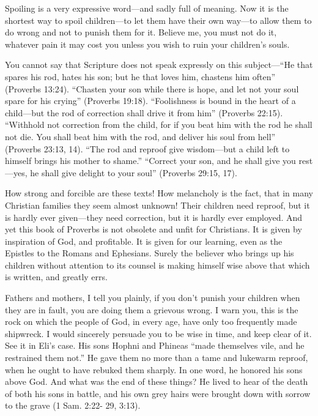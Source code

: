 \documentclass[
]{book}
\begin{document}
Spoiling is a very expressive word---and sadly full of meaning. Now it is the shortest way to spoil children---to let them have their own way---to allow them to do wrong and not to punish them for it. Believe me, you must not do it, whatever pain it may cost you unless you wish to ruin your children's souls.

You cannot say that Scripture does not speak expressly on this subject---``He that spares his rod, hates his son; but he that loves him, chastens him often'' (Proverbs 13:24). ``Chasten your son while there is hope, and let not your soul spare for his crying'' (Proverbs 19:18). ``Foolishness is bound in the heart of a child---but the rod of correction shall drive it from him'' (Proverbs 22:15). ``Withhold not correction from the child, for if you beat him with the rod he shall not die. You shall beat him with the rod, and deliver his soul from hell'' (Proverbs 23:13, 14). ``The rod and reproof give wisdom---but a child left to himself brings his mother to shame.'' ``Correct your son, and he shall give you rest---yes, he shall give delight to your soul'' (Proverbs 29:15, 17).

How strong and forcible are these texts! How melancholy is the fact, that in many Christian families they seem almost unknown! Their children need reproof, but it is hardly ever given---they need correction, but it is hardly ever employed. And yet this book of Proverbs is not obsolete and unfit for Christians. It is given by inspiration of God, and profitable. It is given for our learning, even as the Epistles to the Romans and Ephesians. Surely the believer who brings up his children without attention to its counsel is making himself wise above that which is written, and greatly errs.

Fathers and mothers, I tell you plainly, if you don't punish your children when they are in fault, you are doing them a grievous wrong. I warn you, this is the rock on which the people of God, in every age, have only too frequently made shipwreck. I would sincerely persuade you to be wise in time, and keep clear of it. See it in Eli's case. His sons Hophni and Phineas ``made themselves vile, and he restrained them not.'' He gave them no more than a tame and lukewarm reproof, when he ought to have rebuked them sharply. In one word, he honored his sons above God. And what was the end of these things? He lived to hear of the death of both his sons in battle, and his own grey hairs were brought down with sorrow to the grave (1 Sam. 2:22- 29, 3:13).
\end{document}
